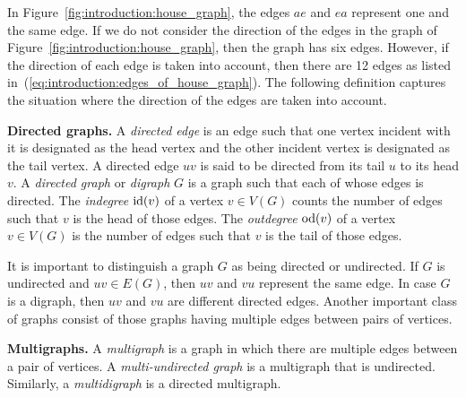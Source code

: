 In Figure~\ref{fig:introduction:house_graph}, the edges $ae$ and $ea$
represent one and the same edge. If we do not consider the direction
of the edges in the graph of
Figure~\ref{fig:introduction:house_graph}, then the graph has six
edges. However, if the direction of each edge is taken into account,
then there are 12 edges as listed
in~(\ref{eq:introduction:edges_of_house_graph}). The following
definition captures the situation where the direction of the edges are
taken into account.

\begin{definition}
\textbf{Directed graphs.}
A \emph{directed edge} is an edge such that one vertex incident with it
is designated as the head vertex and the other incident vertex is
designated as the tail vertex. A directed edge $uv$ is said to be
directed from its tail $u$ to its head $v$. A \emph{directed graph} or
\emph{digraph} $G$ is a graph such that each of whose edges is
directed. The \emph{indegree} $\operatorname*{id}(v)$ of a vertex $v \in V(G)$ counts
the number of edges such that $v$ is the head of those edges. The
\emph{outdegree} $\operatorname*{od}(v)$ of a vertex $v \in V(G)$ is the number of
edges such that $v$ is the tail of those edges.
\end{definition}
\index{$\id$}
\index{$\od$}

It is important to distinguish a graph $G$ as being directed or
undirected. If $G$ is undirected and $uv \in E(G)$, then $uv$ and $vu$
represent the same edge. In case $G$ is a digraph, then $uv$ and $vu$
are different directed edges. Another important class of graphs
consist of those graphs having multiple edges between pairs of
vertices.

\begin{definition}
\textbf{Multigraphs.}
A \emph{multigraph} is a graph in which there are multiple edges
between a pair of vertices. A \emph{multi-undirected graph} is a
multigraph that is undirected. Similarly, a \emph{multidigraph} is a
directed multigraph.
\end{definition}

